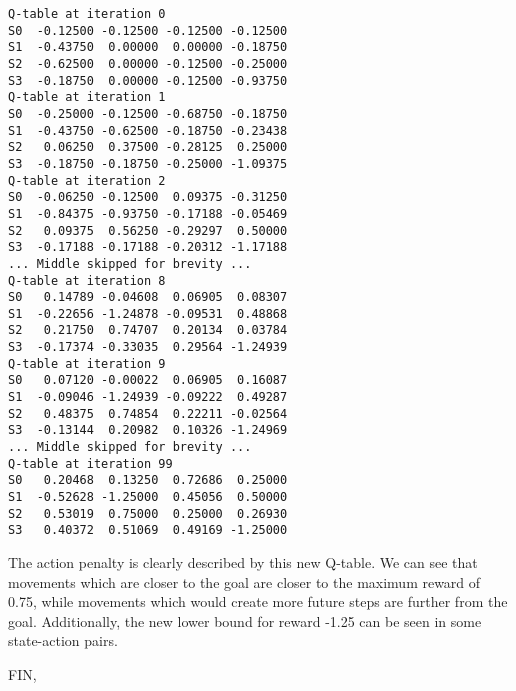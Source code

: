 \documentclass{exam}
\begin{document}
\begin{verbatim}
Q-table at iteration 0
S0	-0.12500 -0.12500 -0.12500 -0.12500 
S1	-0.43750  0.00000  0.00000 -0.18750 
S2	-0.62500  0.00000 -0.12500 -0.25000 
S3	-0.18750  0.00000 -0.12500 -0.93750 
Q-table at iteration 1
S0	-0.25000 -0.12500 -0.68750 -0.18750 
S1	-0.43750 -0.62500 -0.18750 -0.23438 
S2	 0.06250  0.37500 -0.28125  0.25000 
S3	-0.18750 -0.18750 -0.25000 -1.09375 
Q-table at iteration 2
S0	-0.06250 -0.12500  0.09375 -0.31250 
S1	-0.84375 -0.93750 -0.17188 -0.05469 
S2	 0.09375  0.56250 -0.29297  0.50000 
S3	-0.17188 -0.17188 -0.20312 -1.17188 
... Middle skipped for brevity ...
Q-table at iteration 8
S0	 0.14789 -0.04608  0.06905  0.08307 
S1	-0.22656 -1.24878 -0.09531  0.48868 
S2	 0.21750  0.74707  0.20134  0.03784 
S3	-0.17374 -0.33035  0.29564 -1.24939 
Q-table at iteration 9
S0	 0.07120 -0.00022  0.06905  0.16087 
S1	-0.09046 -1.24939 -0.09222  0.49287 
S2	 0.48375  0.74854  0.22211 -0.02564 
S3	-0.13144  0.20982  0.10326 -1.24969 
... Middle skipped for brevity ...
Q-table at iteration 99
S0	 0.20468  0.13250  0.72686  0.25000 
S1	-0.52628 -1.25000  0.45056  0.50000 
S2	 0.53019  0.75000  0.25000  0.26930 
S3	 0.40372  0.51069  0.49169 -1.25000 
\end{verbatim}

The action penalty is clearly described by this new Q-table. We can see that movements which are closer to the goal are closer to the maximum reward of 0.75, while movements which would create more future steps are further from the goal. Additionally, the new lower bound for reward -1.25 can be seen in some state-action pairs.\\

\begin{center}
    FIN,
\end{center}
\end{document}
